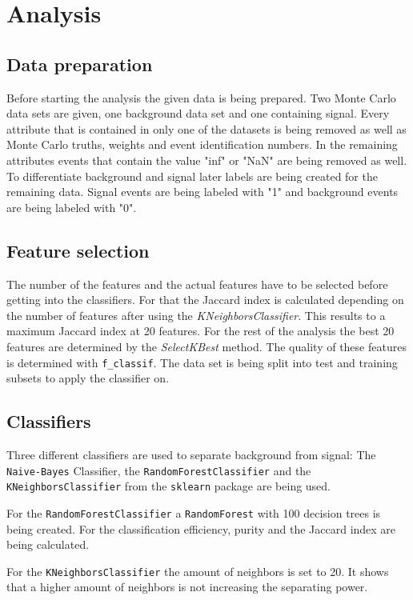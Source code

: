 \section{Analysis}
\label{sec:Analysis}
\subsection{Data preparation}
Before starting the analysis the given data is being prepared.
Two Monte Carlo data sets are given, one background data set and one containing signal.
Every attribute that is contained in only one of the datasets is being removed as well as Monte Carlo truths, weights and event identification numbers.
In the remaining attributes events that contain the value "inf" or "NaN" are being removed as well.
To differentiate background and signal later labels are being created for the remaining data.
Signal events are being labeled with "1" and background events are being labeled with "0".

\subsection{Feature selection}
The number of the features and the actual features have to be selected before getting into the classifiers.
For that the Jaccard index is calculated depending on the number of features after using the \textit{KNeighborsClassifier}.
This results to a maximum Jaccard index at 20 features.
For the rest of the analysis the best 20 features are determined by the \textit{SelectKBest} method.
The quality of these features is determined with \texttt{f\_classif}.
The data set is being split into test and training subsets to apply the classifier on.

\subsection{Classifiers}
Three different classifiers are used to separate background from signal:
The \texttt{Naive-Bayes} Classifier, the \texttt{RandomForestClassifier} and the \texttt{KNeighborsClassifier} from the \texttt{sklearn} package are being used.

For the \texttt{RandomForestClassifier} a \texttt{RandomForest} with 100 decision trees is being created.
For the classification efficiency, purity and the Jaccard index are being calculated.

For the \texttt{KNeighborsClassifier} the amount of neighbors is set to 20.
It shows that a higher amount of neighbors is not increasing the separating power.


